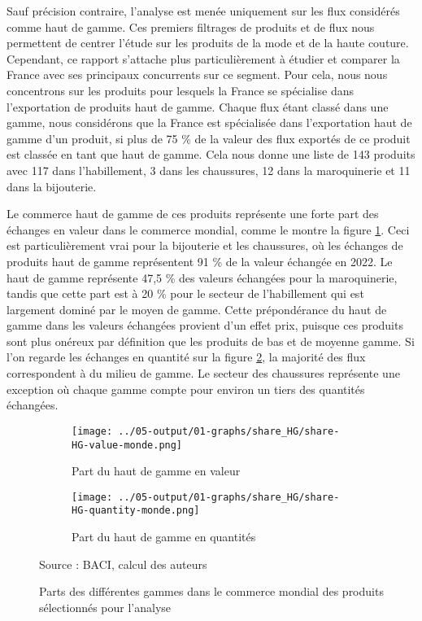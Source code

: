 \documentclass[french,10pt,a4paper]{article}
\begin{document}
Sauf précision contraire, l'analyse est menée uniquement sur les flux considérés comme haut de gamme. Ces premiers filtrages de produits et de flux nous permettent de centrer l'étude sur les produits de la mode et de la haute couture. Cependant, ce rapport s'attache plus particulièrement à étudier et comparer la France avec ses principaux concurrents sur ce segment. Pour cela, nous nous concentrons sur les produits pour lesquels la France se spécialise dans l'exportation de produits haut de gamme. Chaque flux étant classé dans une gamme, nous considérons que la France est spécialisée dans l'exportation haut de gamme d'un produit, si plus de 75 \% de la valeur des flux exportés de ce produit est classée en tant que haut de gamme. Cela nous donne une liste de 143 produits avec 117 dans l'habillement, 3 dans les chaussures, 12 dans la maroquinerie et 11 dans la bijouterie.

Le commerce haut de gamme de ces produits représente une forte part des échanges en valeur dans le commerce mondial, comme le montre la figure \ref{fig:share-HG-value-monde}. Ceci est particulièrement vrai pour la bijouterie et les chaussures, où les échanges de produits haut de gamme représentent 91 \% de la valeur échangée en 2022. Le haut de gamme représente 47,5 \% des valeurs échangées pour la maroquinerie, tandis que cette part est à 20 \% pour le secteur de l'habillement qui est largement dominé par le moyen de gamme. Cette prépondérance du haut de gamme dans les valeurs échangées provient d'un effet prix, puisque ces produits sont plus onéreux par définition que les produits de bas et de moyenne gamme. Si l'on regarde les échanges en quantité sur la figure \ref{fig:share-HG-quantity-monde}, la majorité des flux correspondent à du milieu de gamme. Le secteur des chaussures représente une exception où chaque gamme compte pour environ un tiers des quantités échangées.

\begin{figure}[!h]
  \centering
  \begin{subfigure}{\textwidth}
    \centering    
    \texttt{[image: ../05-output/01-graphs/share\_HG/share-HG-value-monde.png]}
    \caption{Part du haut de gamme en valeur}
    \label{fig:share-HG-value-monde}
  \end{subfigure}
  \vspace{0.5cm}
  \begin{subfigure}{\textwidth}
    \centering
 \texttt{[image: ../05-output/01-graphs/share\_HG/share-HG-quantity-monde.png]}
 \caption{Part du haut de gamme en quantités}
 \label{fig:share-HG-quantity-monde}
\end{subfigure}
\captionsetup{justification=raggedright,singlelinecheck=false, font=small}
  \caption*{Source : BACI, calcul des auteurs}
  \captionsetup{justification=centering, singlelinecheck=true, font=normalsize}
  \caption{Parts des différentes gammes dans le commerce mondial des produits sélectionnés pour l'analyse}
  \label{fig:share-HG-value-quantity-monde}
\end{figure}
\end{document}
